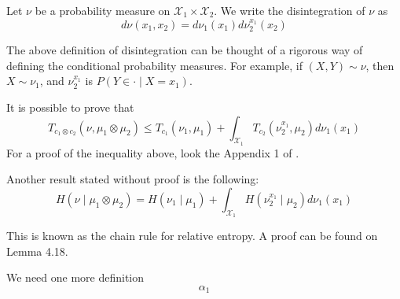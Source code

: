 \documentclass[10pt]{article}
\theoremstyle{definition}
\begin{document}
Let $\nu$ be a probability measure on $\mathcal X_1 \times \mathcal X_2$. We write
the disintegration of $\nu$ as
\begin{equation}
	d\nu(x_1,x_2)	 = d\nu_1(x_1)d\nu_2^{x_1}(x_2)
\end{equation}

The above definition of disintegration can be thought of a rigorous way of defining
the conditional probability measures. For example, if $(X,Y) \sim \nu$,
then $X \sim \nu_1$, and 
$\nu_2^{x_1}$ is $P(Y \in \cdot \mid X = x_1)$.

It is possible to prove that
\begin{equation}
	T_{c_1 \otimes c_2}	(\nu, \mu_1 \otimes \mu_2) \leq
	T_{c_1}	(\nu_1, \mu_1) + \int_{\mathcal X_1} T_{c_2}(\nu_2^{x_1},\mu_2)d\nu_1(x_1)
\end{equation}
For a proof of the inequality above, look the Appendix 1 of \citet{gozlan2010transport}.

Another result stated without proof is the following:
\begin{equation}
	H(\nu\mid \mu_1 \otimes \mu_2)	= H(\nu_1 \mid \mu_1)
	+ \int_{\mathcal X_1} H(\nu_2^{x_1}\mid \mu_2)d\nu_1(x_1)
\end{equation}

This is known as the chain rule for relative entropy. A proof can be found on
\citet{van2014probability} Lemma 4.18.

We need one more definition
$$
\alpha_1
$$



  
  
\end{document}
